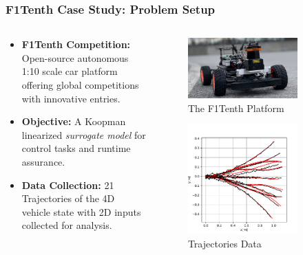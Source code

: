\documentclass[shortpres,aspectratio=43]{beamer}
\begin{document}
\begin{frame}
\frametitle{F1Tenth Case Study: Problem Setup}
\begin{columns}
	\begin{column}{0.5\textwidth}
	\begin{itemize}
	    \item<1-> \textbf{F1Tenth Competition:} Open-source autonomous 1:10 scale car platform offering global competitions with innovative entries.
	    \item<3-> \textbf{Objective:} A Koopman linearized \textit{surrogate model} for control tasks and runtime assurance.
	    \item<4-> \textbf{Data Collection:} 21 Trajectories of the 4D vehicle state with 2D inputs collected for analysis.
	\end{itemize}
	\end{column}
	\begin{column}{0.5\textwidth}
		\begin{figure}
	\centering
	  \includegraphics[width=0.8\textwidth]{./img/f1tenth.png}
	  \tiny
	  \caption{The F1Tenth Platform}
		\end{figure}

		\begin{figure}
	\centering
	  \includegraphics[width=0.8\textwidth]{./img/predictions.pdf} %
	  \tiny
	  \caption{Trajectories Data}
		\end{figure}
	\end{column}

\end{columns}
\end{frame}
\end{document}
